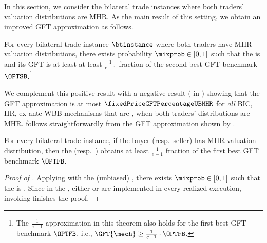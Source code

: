 
In this section, we consider the bilateral trade instances where both traders' valuation distributions are MHR. As the main result of this setting, we obtain an improved GFT approximation as follows.
\begin{theorem}
\label{thm:improved GFT:mhr traders}
For every bilateral trade instance $\btinstance$ where both traders have MHR valuation distributions, there exists probability $\mixprob\in[0, 1]$ such that the {\BiasedRandomOffer} is {\ksfair} and its GFT is at least at least $\frac{1}{e-1}$ fraction of the second best GFT benchmark $\OPTSB$.\footnote{The $\frac{1}{e - 1}$ approximation in this theorem also holds for the first best GFT benchmark $\OPTFB$, i.e., $\GFT{\mech} \geq \frac{1}{e - 1}\cdot \OPTFB$.}
\end{theorem}
 We complement this positive result with a negative result ( in ) showing that the GFT approximation is at most $\fixedPriceGFTPercentageUBMHR$ for \emph{all} BIC, IIR, ex ante WBB mechanisms that are {\ksfair}, when both traders' distributions are MHR.
 follows straightforwardly from the GFT approximation shown by \citet{Fei-22}.

\begin{theorem}
\label{thm:BO SO GFT:mhr traders}
    For every bilateral trade instance, if the buyer (resp.\ seller) has MHR valuation distribution, then the {\SellerOffer} (resp.\ {\BuyerOffer}) obtains at least $\frac{1}{e - 1}$ fraction of the first best GFT benchmark $\OPTFB$.
\end{theorem}

\begin{proof}[Proof of ]
    Applying  with the (unbiased) {\RandomOffer}, there exists $\mixprob\in[0, 1]$ such that the {\BiasedRandomOffer} is {\ksfair}. Since in the {\BiasedRandomOffer}, either {\BuyerOffer} or {\SellerOffer} are implemented in every realized execution, invoking  finishes the proof.
\end{proof}


